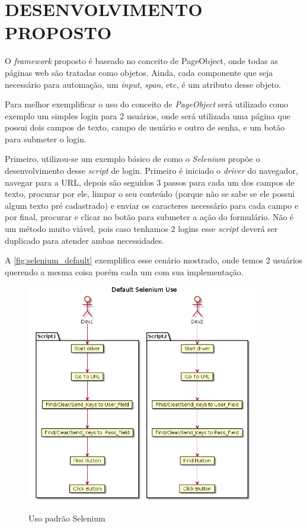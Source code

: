 %
%

\chapter{DESENVOLVIMENTO PROPOSTO}\label{chap:proj}
    O \textit{framework} proposto é baseado no conceito de PageObject, onde todas as páginas web são tratadas como objetos.
    Ainda, cada componente que seja necessário para automação, um \emph{input}, \emph{span}, etc, é um atributo desse objeto.

    Para melhor exemplificar o uso do conceito de \emph{PageObject} será utilizado como exemplo um simples login para 2
    usuários, onde será utilizada uma página que possui dois campos de texto, campo de usuário e outro de senha,
    e um botão para submeter o login.

    Primeiro, utilizou-se um exemplo básico de como o \textit{Selenium} propõe o desenvolvimento desse \emph{script} de login.
    Primeiro é iniciado o \emph{driver} do navegador, navegar para a URL, depois
    são seguidos 3 passos para cada um dos campos de texto, procurar por ele, limpar o seu conteúdo
    (porque não se sabe se ele possui algum texto pré cadastrado) e enviar os caracteres necessário para
    cada campo e por final, procurar e clicar no botão para submeter a ação do formulário. Não é um método muito viável,
    pois caso tenhamos 2 logins esse \emph{script} deverá ser duplicado para atender ambas necessidades.

    A \autoref{fig:selenium_default} exemplifica esse cenário mostrado, onde temos 2 usuários querendo a mesma coisa porém
    cada um com sua implementação.


    \begin{figure}[H]
        \vspace*{0,3cm}
        \centering
        \caption{Uso padrão Selenium}
        \includegraphics[width=0.9\textwidth]{./04-figuras/page_object_selenium}
        \label{fig:selenium_default}
    \end{figure}
    \vspace*{-0,9cm}
    {\raggedright {}}

